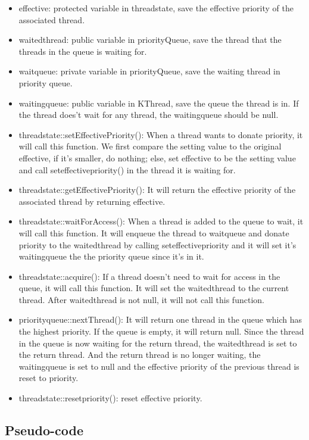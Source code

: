 \documentclass[a4paper,10pt]{article}
\begin{document}
\begin{itemize}
\item
effective: protected variable in threadstate, save the effective priority of the associated thread.
\item
waitedthread: public variable in priorityQueue, save the thread that the threads in the queue is waiting for.
\item
waitqueue: private variable in priorityQueue, save the waiting thread in priority queue.
\item
waitingqueue: public variable in KThread, save the queue the thread is in. If the thread does't wait for any thread, the waitingqueue should be null.
\item
threadstate::setEffectivePriority(): When a thread wants to donate priority, it will call this function. We first compare the setting value to the original effective, if it's smaller, do nothing; else, set effective to be the setting value and call seteffectivepriority() in the thread it is waiting for.
\item
threadstate::getEffectivePriority(): It will return the effective priority of the associated thread by returning effective.
\item
threadstate::waitForAccess():  When a thread is added to the queue to wait, it will call this function. It will enqueue the thread to waitqueue and donate priority to the waitedthread by calling seteffectivepriority and it will set it's waitingqueue the the priority queue since it's in it.
\item
threadstate::acquire(): If a thread doesn't need to wait for access in the queue, it will call this function. It will set the waitedthread to the current thread. After waitedthread is not null, it will not call this function.
\item
priorityqueue::nextThread(): It will return one thread in the queue which has the highest priority. If the queue is empty, it will return null. Since the thread in the queue is now waiting for the return thread, the waitedthread is set to the return thread. And the return thread is no longer waiting, the waitingqueue is set to null and the effective priority of the previous thread is reset to priority.
\item
threadstate::resetpriority(): reset effective priority.
\end{itemize}

\subsection{Pseudo-code}
\end{document}
